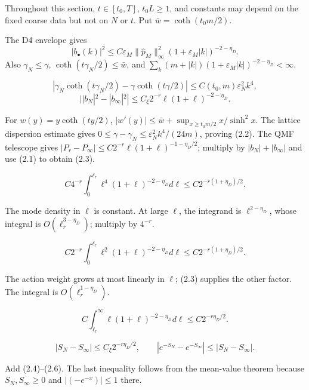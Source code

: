 \documentclass[11pt,a4paper]{article}
\newcommand{\eps}{\varepsilon}
\newcommand{\cth}{\operatorname{coth}}
\begin{document}
Throughout this section, $t\in[t_0,T]$, $t_0L\ge1$, and constants may depend on
the fixed coarse data but not on $N$ or $t$.  Put
$\bar w=\cth(t_0m/2)$.



\Because The D4 envelope gives
\[
 |b_\bullet(k)|^2\le C\eps_M\|\widehat p_M\|_\infty^2
 (1+\eps_M|k|)^{-2-\eta_D}.
\tag{2.1}
\]
Also $\gamma_N\le\gamma$, $\cth(t\gamma_N/2)\le\bar w$, and
$\sum_k(m+|k|)(1+\eps_M|k|)^{-2-\eta_D}<\infty$.

\LS{2}{2}{Let $\ell=\eps_M|k|$ and split at $\ell_r=2^{r/2}$.  On
$\ell\le\ell_r$,}
\[
 |\gamma_N\cth(t\gamma_N/2)-\gamma\cth(t\gamma/2)|
 \le C(t_0,m)\eps_N^2k^4,
\tag{2.2}
\]
\[
 ||b_N|^2-|b_\infty|^2|
 \le C_\xi2^{-r}\ell(1+\ell)^{-2-\eta_D}.
\tag{2.3}
\]

\Because For $w(y)=y\cth(ty/2)$,
$|w'(y)|\le\bar w+\sup_{x\ge t_0m/2}x/\sinh^2x$.  The lattice dispersion
estimate gives $0\le\gamma-\gamma_N\le\eps_N^2k^4/(24m)$, proving
(2.2).  The QMF telescope gives
$|P_r-P_\infty|\le C2^{-r}\ell(1+\ell)^{-1-\eta_D/2}$; multiply by
$|b_N|+|b_\infty|$ and use (2.1) to obtain (2.3).

\[
 C4^{-r}\int_0^{\ell_r}\ell^4(1+\ell)^{-2-\eta_D}d\ell
 \le C2^{-r(1+\eta_D)/2}.
\tag{2.4}
\]

\Because The mode density in $\ell$ is constant.  At large $\ell$, the
integrand is $\ell^{2-\eta_D}$, whose integral is
$O(\ell_r^{3-\eta_D})$; multiply by $4^{-r}$.

\[
 C2^{-r}\int_0^{\ell_r}\ell^2(1+\ell)^{-2-\eta_D}d\ell
 \le C2^{-r(1+\eta_D)/2}.
\tag{2.5}
\]

\Because The action weight grows at most linearly in $\ell$; (2.3) supplies the
other factor.  The integral is $O(\ell_r^{1-\eta_D})$.

\[
 C\int_{\ell_r}^\infty\ell(1+\ell)^{-2-\eta_D}d\ell
 \le C2^{-r\eta_D/2}.
\tag{2.6}
\]

\[
 |S_N-S_\infty|\le C_\xi2^{-r\eta_D/2},\qquad
 |e^{-S_N}-e^{-S_\infty}|\le|S_N-S_\infty|.
\tag{2.7}
\]

\Because Add (2.4)--(2.6).  The last inequality follows from the mean-value
theorem because $S_N,S_\infty\ge0$ and $|(-e^{-x})|\le1$ there.

\QedStep
\end{document}

